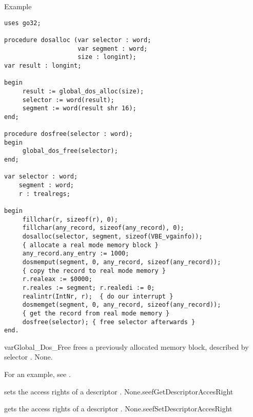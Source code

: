 \begin{FPCList}
\item[Example]
\begin{verbatim}
uses go32;

procedure dosalloc (var selector : word; 
                    var segment : word; 
                    size : longint);
var result : longint;

begin
     result := global_dos_alloc(size);
     selector := word(result);
     segment := word(result shr 16);
end;

procedure dosfree(selector : word);
begin
     global_dos_free(selector);
end;

var selector : word;
    segment : word;
    r : trealregs;

begin
     fillchar(r, sizeof(r), 0);
     fillchar(any_record, sizeof(any_record), 0);
     dosalloc(selector, segment, sizeof(VBE_vgainfo)); 
     { allocate a real mode memory block }
     any_record.any_entry := 1000;
     dosmemput(segment, 0, any_record, sizeof(any_record)); 
     { copy the record to real mode memory } 
     r.realeax := $0000; 
     r.reales := segment; r.realedi := 0;
     realintr(IntNr, r);  { do our interrupt }
     dosmemget(segment, 0, any_record, sizeof(any_record)); 
     { get the record from real mode memory }
     dosfree(selector); { free selector afterwards }
end.
\end{verbatim}
\end{FPCList}

{var{Global\_Dos\_Free} frees a previously allocated \dos memory 
block, described by selector .
}
{None.}
{}

For an example, see .

{ sets the access rights of a
descriptor .}
{None.}{seef{GetDescriptorAccesRight}}

{ gets the access rights of a
descriptor .}
{None.}{seef{SetDescriptorAccesRight}}

